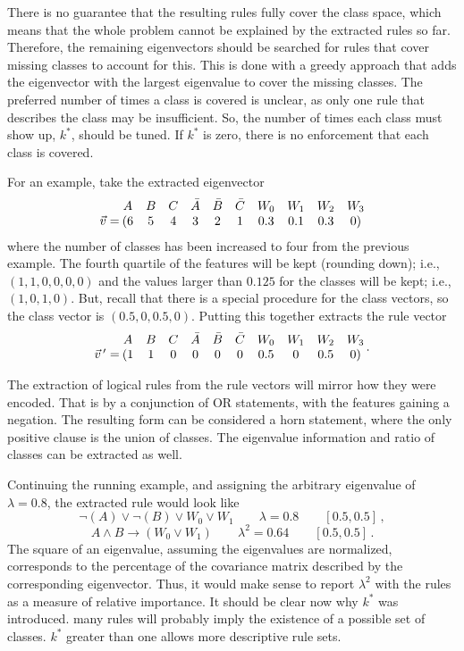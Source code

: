 \documentclass[11pt]{article}
\begin{document}
There is no guarantee that the resulting rules fully cover the class space, which means that the whole problem cannot be explained by the extracted rules so far. Therefore, the remaining eigenvectors should be searched for rules that cover missing classes to account for this. This is done with a greedy approach that adds the eigenvector with the largest eigenvalue to cover the missing classes. The preferred number of times a class is covered is unclear, as only one rule that describes the class may be insufficient. So, the number of times each class must show up, $k^*$, should be tuned. If $k^*$ is zero, there is no enforcement that each class is covered. 

For an example, take the extracted eigenvector
\[\mqty{\, \\\vec{v} = } \:\mqty{A&B&C&\bar{A}&\bar{B}&\bar{C}&W_0&W_1&W_2&W_3\\(6&5&4&3&2&1&0.3&0.1&0.3&0)}\]
where the number of classes has been increased to four from the previous example. The fourth quartile of the features will be kept (rounding down); i.e., $(1,1,0,0,0,0)$ and the values larger than $0.125$ for the classes will be kept; i.e., $(1, 0, 1, 0)$. But, recall that there is a special procedure for the class vectors, so the class vector is $(0.5, 0, 0.5, 0)$. Putting this together extracts the rule vector 
\[\mqty{\, \\\vec{v}\, ^\prime = } \:\mqty{A&B&C&\bar{A}&\bar{B}&\bar{C}&W_0&W_1&W_2&W_3\\(1&1&0&0&0&0&0.5&0&0.5&0)} \, .\]

The extraction of logical rules from the rule vectors will mirror how they were encoded. That is by a conjunction of OR statements, with the features gaining a negation. The resulting form can be considered a horn statement, where the only positive clause is the union of classes. The eigenvalue information and ratio of classes can be extracted as well. 

Continuing the running example, and assigning the arbitrary eigenvalue of $\lambda =0.8$, the extracted rule would look like
\[\neg(A)\lor \neg(B) \lor W_0 \lor W_1 \qquad \lambda=0.8 \qquad [0.5, 0.5] \, ,\]
\[A \land B \rightarrow (W_0 \lor W_1) \qquad \lambda^2=0.64 \qquad [0.5, 0.5] \, .\]
The square of an eigenvalue, assuming the eigenvalues are normalized, corresponds to the percentage of the covariance matrix described by the corresponding eigenvector. Thus, it would make sense to report $\lambda^2$ with the rules as a measure of relative importance. It should be clear now why $k^*$ was introduced. many rules will probably imply the existence of a possible set of classes. $k^*$ greater than one allows more descriptive rule sets.
\end{document}
